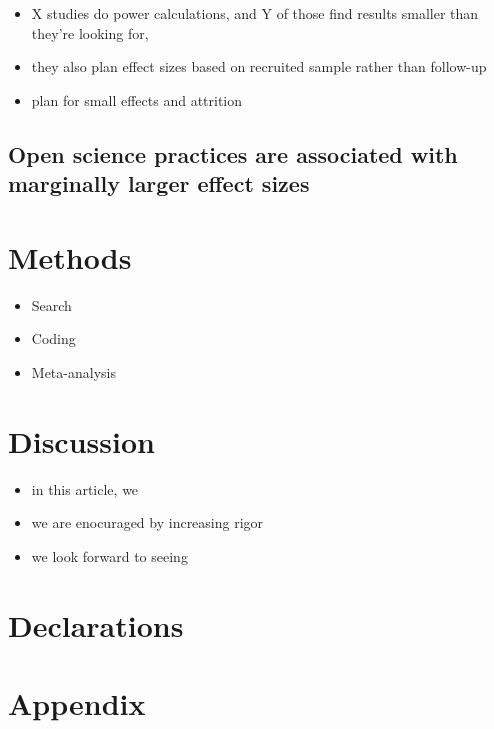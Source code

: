 \documentclass[sn-nature,pdflatex]{sn-jnl}
\providecommand{\tightlist}{%
  \setlength{\itemsep}{0pt}\setlength{\parskip}{0pt}}
\begin{document}
\begin{itemize}
\tightlist
\item
  X studies do power calculations, and Y of those find results smaller
  than they're looking for,
\item
  they also plan effect sizes based on recruited sample rather than
  follow-up
\item
  plan for small effects and attrition
\end{itemize}

\subsection{Open science practices are associated with marginally larger
effect
sizes}\label{open-science-practices-are-associated-with-marginally-larger-effect-sizes}

\section{Methods}\label{sec3}

\begin{itemize}
\tightlist
\item
  Search
\item
  Coding
\item
  Meta-analysis
\end{itemize}

\section{Discussion}\label{sec4}

\begin{itemize}
\tightlist
\item
  in this article, we
\item
  we are enocuraged by increasing rigor
\item
  we look forward to seeing
\end{itemize}

\backmatter



\section*{Declarations}\label{declarations}

\section{Appendix}\label{secA1}
\end{document}
